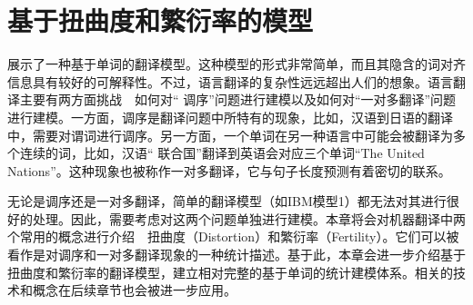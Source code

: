 
%


\renewcommand\figurename{图}%
\renewcommand\tablename{表}%


\chapter{基于扭曲度和繁衍率的模型}

{\chapterfive}展示了一种基于单词的翻译模型。这种模型的形式非常简单，而且其隐含的词对齐信息具有较好的可解释性。不过，语言翻译的复杂性远远超出人们的想象。语言翻译主要有两方面挑战\ \dash\ 如何对“ 调序”问题进行建模以及如何对“一对多翻译”问题进行建模。一方面，调序是翻译问题中所特有的现象，比如，汉语到日语的翻译中，需要对谓词进行调序。另一方面，一个单词在另一种语言中可能会被翻译为多个连续的词，比如，汉语“ 联合国”翻译到英语会对应三个单词“The United Nations”。这种现象也被称作一对多翻译，它与句子长度预测有着密切的联系。

无论是调序还是一对多翻译，简单的翻译模型（如IBM模型1）都无法对其进行很好的处理。因此，需要考虑对这两个问题单独进行建模。本章将会对机器翻译中两个常用的概念进行介绍\ \dash\ 扭曲度（Distortion）和繁衍率（Fertility）。它们可以被看作是对调序和一对多翻译现象的一种统计描述。基于此，本章会进一步介绍基于扭曲度和繁衍率的翻译模型，建立相对完整的基于单词的统计建模体系。相关的技术和概念在后续章节也会被进一步应用。



